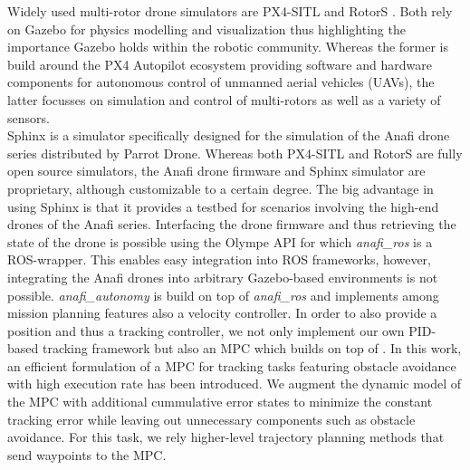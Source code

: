 Widely used multi-rotor drone simulators are PX4-SITL \cite{px4_sitl} and RotorS \cite{furrer2016}. Both rely on Gazebo for physics modelling and visualization thus highlighting the importance Gazebo holds within the robotic community. Whereas the former is build around the PX4 Autopilot ecosystem providing software and hardware components for autonomous control of unmanned aerial vehicles (UAVs), the latter focusses on simulation and control of multi-rotors as well as a variety of sensors.\\ %
Sphinx \cite{parrot_sphinx} is a simulator specifically designed for the simulation of the Anafi drone series distributed by Parrot Drone. Whereas both PX4-SITL and RotorS are fully open source simulators, the Anafi drone firmware and Sphinx simulator are proprietary, although customizable to a certain degree. The big advantage in using Sphinx is that it provides a testbed for  scenarios involving the high-end  drones of the Anafi series. Interfacing the drone firmware and thus retrieving the state of the drone is possible using the Olympe API \cite{parrot_olympe} for which \textit{anafi_ros} \cite{sarabakha2023} is a ROS-wrapper. This enables easy integration into ROS frameworks, however, integrating the Anafi drones into arbitrary Gazebo-based environments is not possible. \textit{anafi_autonomy} \cite{anafi_autonomy} is build on top of \textit{anafi_ros} and implements among mission planning features also a velocity controller. In order to  also provide a position and thus a tracking controller, we not only implement our own PID-based tracking framework but also an MPC which builds on top of \cite{tallamraju2018}. In this work, an efficient formulation of a MPC for tracking tasks featuring obstacle avoidance with high execution rate has been introduced. We  augment the dynamic model of the MPC with additional cummulative error states to minimize the constant tracking error while leaving out unnecessary components such as obstacle avoidance. For this task, we rely higher-level trajectory planning methods that send waypoints to the MPC. 

